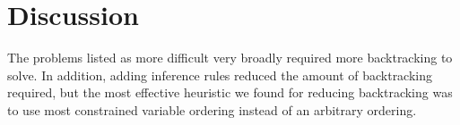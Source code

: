 \documentclass{article}
\begin{document}
\section{Discussion}
The problems listed as more difficult very broadly required more backtracking to solve. In addition, adding inference rules reduced the amount of backtracking required, but the most effective heuristic we found for reducing backtracking was to use most constrained variable ordering instead of an arbitrary ordering. 


  
\end{document}
